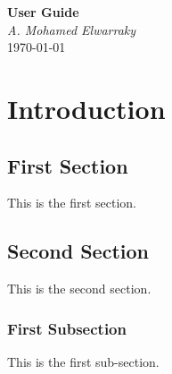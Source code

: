 \documentclass[12pt, letterpaper]{report}
\begin{document}
\begin{titlepage}
    \begin{center}
       \Large\textbf{User Guide}\\
       \large\textit{A. Mohamed Elwarraky}\\
       \large\today
    \end{center}
\end{titlepage}

\newpage

\chapter{Introduction}

\section{First Section}

This is the first section.

\section{Second Section}

This is the second section.

\subsection{First Subsection}

This is the first sub-section.
\end{document}
